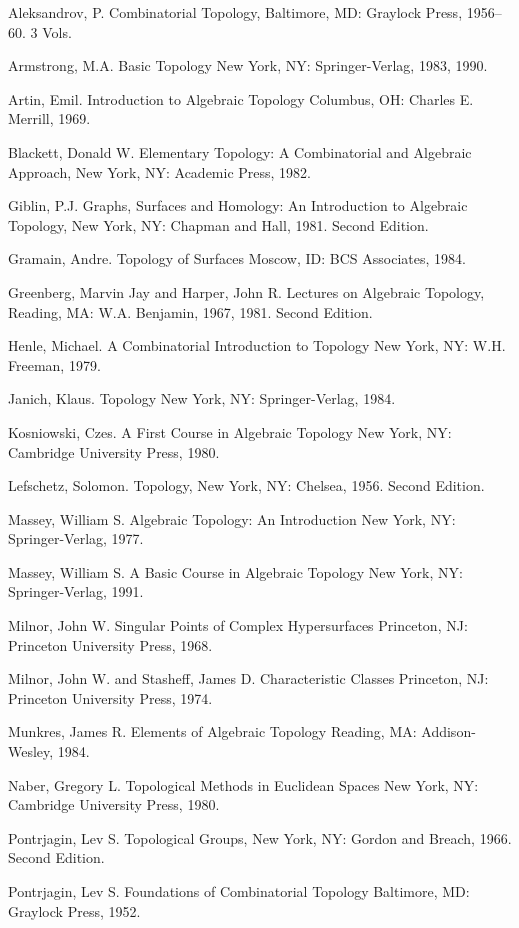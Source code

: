 \documentclass[12pt]{article}
\theoremstyle{plain}
\theoremstyle{definition}
\numberwithin{equation}{section}
\begin{document}
Aleksandrov, P. Combinatorial Topology, Baltimore, MD: Graylock Press, 1956--60. 3 Vols. 

Armstrong, M.A. Basic Topology New York, NY: Springer-Verlag, 1983, 1990. 

Artin, Emil. Introduction to Algebraic Topology Columbus, OH: Charles E. Merrill, 1969. 

Blackett, Donald W. Elementary Topology: A Combinatorial and Algebraic Approach, New York, NY: Academic Press, 1982. 

Giblin, P.J. Graphs, Surfaces and Homology: An Introduction to Algebraic Topology, New York, NY: Chapman and Hall, 1981. Second Edition. 

Gramain, Andre. Topology of Surfaces Moscow, ID: BCS Associates, 1984. 

Greenberg, Marvin Jay and Harper, John R. Lectures on Algebraic Topology, Reading, MA: W.A. Benjamin, 1967, 1981. Second Edition. 

Henle, Michael. A Combinatorial Introduction to Topology New York, NY: W.H. Freeman, 1979. 

Janich, Klaus. Topology New York, NY: Springer-Verlag, 1984. 

Kosniowski, Czes. A First Course in Algebraic Topology New York, NY: Cambridge University Press, 1980. 

Lefschetz, Solomon. Topology, New York, NY: Chelsea, 1956. Second Edition. 

Massey, William S. Algebraic Topology: An Introduction New York, NY: Springer-Verlag, 1977. 

Massey, William S. A Basic Course in Algebraic Topology New York, NY: Springer-Verlag, 1991. 

Milnor, John W. Singular Points of Complex Hypersurfaces Princeton, NJ: Princeton University Press, 1968. 

Milnor, John W. and Stasheff, James D. Characteristic Classes Princeton, NJ: Princeton University Press, 1974. 

Munkres, James R. Elements of Algebraic Topology Reading, MA: Addison-Wesley, 1984. 

Naber, Gregory L. Topological Methods in Euclidean Spaces New York, NY: Cambridge University Press, 1980. 

Pontrjagin, Lev S. Topological Groups, New York, NY: Gordon and Breach, 1966. Second Edition. 

Pontrjagin, Lev S. Foundations of Combinatorial Topology Baltimore, MD: Graylock Press, 1952. 
\end{document}
